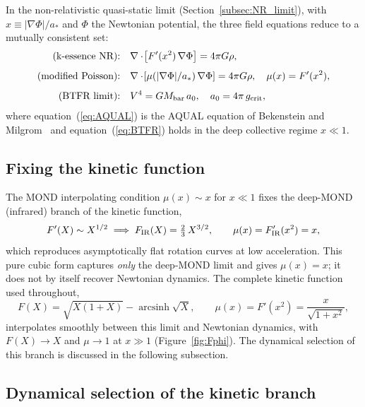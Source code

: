 \documentclass[11pt,a4paper]{article}
\begin{document}
In the non-relativistic quasi-static limit (Section~\ref{subsec:NR_limit}), with
$x \equiv |\nabla\Phi|/a_*$ and $\Phi$ the Newtonian potential, the three field
equations reduce to a mutually consistent set:
\begin{align}
  \text{(k-essence NR):}\quad &\nabla\cdot\!\left[F'(x^2)\,\nabla\Phi\right] = 4\pi G\rho,
  \label{eq:NR_kessence}\\[4pt]
  \text{(modified Poisson):}\quad &\nabla\cdot\!\left[\mu(|\nabla\Phi|/a_*)\,\nabla\Phi\right]
  = 4\pi G\rho,\quad \mu(x) = F'(x^2),
  \label{eq:AQUAL}\\[4pt]
  \text{(BTFR limit):}\quad &V^4 = G M_{\rm bar}\,a_0,\quad a_0 = 4\pi\,g_{\rm crit},
  \label{eq:BTFR}
\end{align}
where equation~(\ref{eq:AQUAL}) is the AQUAL equation of Bekenstein and Milgrom~\cite{Bekenstein1984}
and equation~(\ref{eq:BTFR}) holds in the deep collective regime $x\ll 1$.

\subsection{Fixing the kinetic function}
\label{subsec:FX}

The MOND interpolating condition $\mu(x)\sim x$ for $x\ll 1$ fixes the deep-MOND
(infrared) branch of the kinetic function,
\begin{equation}
  F'(X)\sim X^{1/2} \implies F_{\rm IR}(X) = \tfrac{2}{3}\,X^{3/2},
  \qquad \mu(x)=F_{\rm IR}'(x^2)=x,
  \label{eq:F_AQUAL}
\end{equation}
which reproduces asymptotically flat rotation curves at low acceleration. This pure cubic
form captures \emph{only} the deep-MOND limit and gives $\mu(x)=x$; it does not by itself
recover Newtonian dynamics. The complete kinetic function used throughout,
\begin{equation}
  F(X) = \sqrt{X(1+X)} - \operatorname{arcsinh}\!\sqrt{X},
  \qquad \mu(x)=F'(x^2)=\frac{x}{\sqrt{1+x^2}},
  \label{eq:F_full}
\end{equation}
interpolates smoothly between this limit and Newtonian dynamics, with $F(X)\to X$ and
$\mu\to 1$ at $x\gg 1$ (Figure~\ref{fig:Fphi}). The dynamical selection of this branch is
discussed in the following subsection.

\subsection{Dynamical selection of the kinetic branch}
\label{subsec:FX_attractor}
\end{document}
